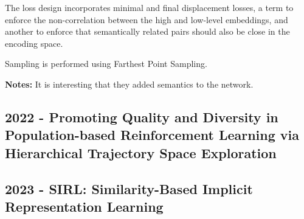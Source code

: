 The loss design incorporates minimal and final displacement losses, a term to enforce the non-correlation between the high and low-level embeddings, and another to enforce that semantically related pairs should also be close in the encoding space.

Sampling is performed using Farthest Point Sampling.

\textbf{Notes:} It is interesting that they added semantics to the network.

\subsection*{2022 - Promoting Quality and Diversity in Population-based Reinforcement Learning via Hierarchical Trajectory Space Exploration}
\cite{miao2022promoting}

\subsection*{2023 - SIRL: Similarity-Based Implicit Representation Learning}
\cite{bobu2023sirl}
